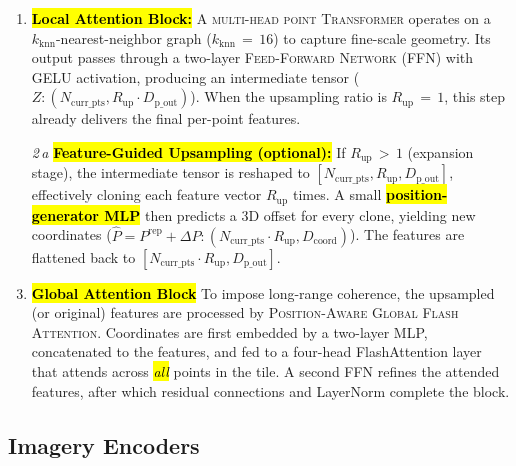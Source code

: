 \documentclass[remotesensing,article,accept,pdftex,moreauthors]{Definitions/mdpi}
\begin{document}
\begin{enumerate}[leftmargin=*]
\item \textbf{\hl{Local Attention Block:}}  
      A %
      \textsc{multi-head point Transformer} operates on a $k_{\text{knn}}$-nearest-neighbor graph ($k_{\text{knn}}\,{=}\,16$) to capture fine-scale geometry. Its output passes through a two-layer \textsc{Feed-Forward Network} (FFN) with GELU activation, producing an intermediate tensor 
      ($Z: (N_{\text{curr\_pts}}, R_{\text{up}} \cdot D_{\text{p\_out}})$). When the upsampling ratio is $R_{\text{up}}\,{=}\,1$, this step already delivers the final per-point features.

\item[\emph{2\,a}] \textbf{\hl{Feature-Guided Upsampling (optional):} %
}  
      If $R_{\text{up}}\,{>}\,1$ (expansion stage), the intermediate tensor is reshaped to $[N_{\text{curr\_pts}}, R_{\text{up}}, D_{\text{p\_out}}]$, effectively cloning each feature vector $R_{\text{up}}$ times.  
      A small \textbf{\hl{position-generator MLP}} then predicts a 3D offset for every clone, yielding new coordinates  
      ($\hat{P} = P^{\text{rep}} + \Delta P: (N_{\text{curr\_pts}} \cdot R_{\text{up}}, D_{\text{coord}})$).  
      The features are flattened back to $[N_{\text{curr\_pts}} \cdot R_{\text{up}}, D_{\text{p\_out}}]$.

\item \textbf{\hl{Global Attention Block}}  
      To impose long-range coherence, the upsampled (or original) features are processed by %
      \textsc{Position-Aware Global Flash Attention}. Coordinates are first embedded by a two-layer MLP, concatenated to the features, and fed to a four-head FlashAttention layer that attends across \emph{\hl{all}} points in the tile. A second FFN refines the attended features, after which residual connections and LayerNorm complete the block.
\end{enumerate}



\subsection{Imagery Encoders}
\label{sec:img_enc}
\end{document}
